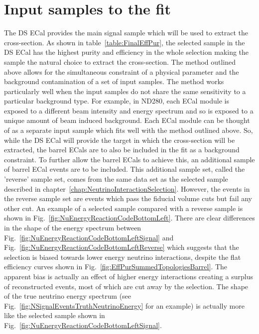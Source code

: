 \section{Input samples to the fit}
\label{sec:InputSamples}
The DS ECal provides the main signal sample which will be used to extract the cross-section.  As shown in table~\ref{table:FinalEffPur}, the selected sample in the DS ECal has the highest purity and efficiency in the whole selection making the sample the natural choice to extract the cross-section.
\newline
\newline
The method outlined above allows for the simultaneous constraint of a physical parameter and the background contamination of a set of input samples.  The method works particularly well when the input samples do not share the same sensitivity to a particular background type.  For example, in ND280, each ECal module is exposed to a different beam intensity and energy spectrum and so is exposed to a unique amount of beam induced background.  Each ECal module can be thought of as a separate input sample which fits well with the method outlined above.  So, while the DS ECal will provide the target in which the cross-section will be extracted, the barrel ECals are to also be included in the fit as a background constraint.  To further allow the barrel ECals to achieve this, an additional sample of barrel ECal events are to be included.  This additional sample set, called the 'reverse' sample set,  comes from the same data set as the selected sample described in chapter~\ref{chap:NeutrinoInteractionSelection}.  However, the events in the reverse sample set are events which pass the fiducial volume cuts but fail any other cut.  An example of a selected sample compared with a reverse sample is shown in Fig.~\ref{fig:NuEnergyReactionCodeBottomLeft}.  There are clear differences in the shape of the energy spectrum between Fig.~\ref{fig:NuEnergyReactionCodeBottomLeftSignal} and Fig.~\ref{fig:NuEnergyReactionCodeBottomLeftReverse} which suggests that the selection is biased towards lower energy neutrino interactions, despite the flat efficiency curves shown in Fig.~\ref{fig:EffPurSummedTopologiesBarrel}. The apparent bias is actually an effect of higher energy interactions creating a surplus of reconstructed events, most of which are cut away by the selection.  The shape of the true neutrino energy spectrum (see Fig.~\ref{fig:NSignalEventsTruthNeutrinoEnergy} for an example) is actually more like the selected sample shown in Fig.~\ref{fig:NuEnergyReactionCodeBottomLeftSignal}.
